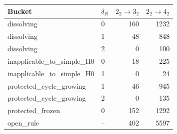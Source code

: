 \begin{tabular}{llrr}
\toprule
Bucket & $\delta_R$ & $2_2\to3_2$ & $2_2\to4_2$\\
\midrule
dissolving & 0 & 160 & 1232\\
dissolving & 1 & 48 & 848\\
dissolving & 2 & 0 & 100\\
inapplicable\_to\_simple\_H0 & 0 & 18 & 225\\
inapplicable\_to\_simple\_H0 & 1 & 0 & 24\\
protected\_cycle\_growing & 1 & 46 & 945\\
protected\_cycle\_growing & 2 & 0 & 135\\
protected\_frozen & 0 & 152 & 1292\\
open\_rule & -- & 402 & 5597\\
\bottomrule
\end{tabular}

